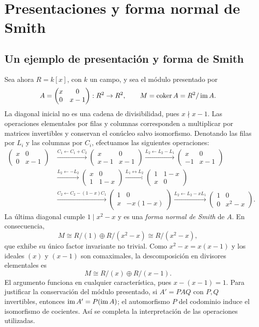 \section{Presentaciones y forma normal de Smith}\label{sec:modulos-smith}

\subsection{Un ejemplo de presentación y forma de Smith}\label{tema:21-4-0}
Sea ahora $R=k[x]$, con $k$ un campo, y sea el módulo presentado por
\[
A=\begin{pmatrix}x&0\\0&x-1\end{pmatrix}:R^2\to R^2,
\qquad M=\operatorname{coker} A=R^2/\operatorname{im} A.
\]
La diagonal inicial no es una cadena de divisibilidad, pues $x\nmid x-1$. Las operaciones elementales por filas y columnas corresponden a multiplicar por matrices invertibles y conservan el conúcleo salvo isomorfismo. Denotando las filas por $L_i$ y las columnas por $C_i$, efectuamos las siguientes operaciones:
\begin{align*}
\begin{pmatrix}x&0\\0&x-1\end{pmatrix}
&\xrightarrow{C_1\leftarrow C_1+C_2}
\begin{pmatrix}x&0\\x-1&x-1\end{pmatrix}
\xrightarrow{L_2\leftarrow L_2-L_1}
\begin{pmatrix}x&0\\-1&x-1\end{pmatrix}\\[3pt]
&\xrightarrow{L_2\leftarrow-L_2}
\begin{pmatrix}x&0\\1&1-x\end{pmatrix}
\xrightarrow{L_1\leftrightarrow L_2}
\begin{pmatrix}1&1-x\\x&0\end{pmatrix}\\[3pt]
&\xrightarrow{C_2\leftarrow C_2-(1-x)C_1}
\begin{pmatrix}1&0\\x&-x(1-x)\end{pmatrix}
\xrightarrow{L_2\leftarrow L_2-xL_1}
\begin{pmatrix}1&0\\0&x^2-x\end{pmatrix}.
\end{align*}
La última diagonal cumple $1\mid x^2-x$ y es una \emph{forma normal de Smith} de $A$. En consecuencia,
\[
M\cong R/(1)\oplus R/(x^2-x)\cong R/(x^2-x),
\]
que exhibe su único factor invariante no trivial. Como $x^2-x=x(x-1)$ y los ideales $(x)$ y $(x-1)$ son comaximales, la descomposición en divisores elementales es
\[
M\cong R/(x)\oplus R/(x-1).
\]
El argumento funciona en cualquier característica, pues $x-(x-1)=1$. Para justificar la conservación del módulo presentado, si $A'=PAQ$ con $P,Q$ invertibles, entonces $\operatorname{im} A'=P(\operatorname{im} A)$; el automorfismo $P$ del codominio induce el isomorfismo de cocientes. Así se completa la interpretación de las operaciones utilizadas.
